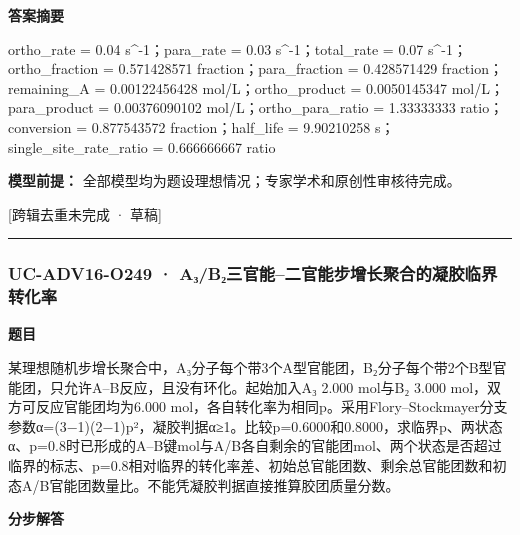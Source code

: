 \documentclass[UTF8,11pt,a4paper]{ctexart}
\begin{document}
\noindent\textbf{答案摘要}\par
ortho\_rate = 0.04 s\textasciicircum{}-1；para\_rate = 0.03 s\textasciicircum{}-1；total\_rate = 0.07 s\textasciicircum{}-1；ortho\_fraction = 0.571428571 fraction；para\_fraction = 0.428571429 fraction；remaining\_A = 0.00122456428 mol/L；ortho\_product = 0.0050145347 mol/L；para\_product = 0.00376090102 mol/L；ortho\_para\_ratio = 1.33333333 ratio；conversion = 0.877543572 fraction；half\_life = 9.90210258 s；single\_site\_rate\_ratio = 0.666666667 ratio\par
\noindent\textbf{模型前提：}
全部模型均为题设理想情况；专家学术和原创性审核待完成。\par
\noindent\textcolor{red!65!black}{[跨辑去重未完成 · 草稿]} \par
\medskip\hrule\medskip
{}
\subsubsection*{UC-ADV16-O249 · A₃/B₂三官能–二官能步增长聚合的凝胶临界转化率}
\noindent\textbf{题目}\par
某理想随机步增长聚合中，A₃分子每个带3个A型官能团，B₂分子每个带2个B型官能团，只允许A–B反应，且没有环化。起始加入A₃ 2.000 mol与B₂ 3.000 mol，双方可反应官能团均为6.000 mol，各自转化率为相同p。采用Flory–Stockmayer分支参数α=(3−1)(2−1)p²，凝胶判据α≥1。比较p=0.6000和0.8000，求临界p、两状态α、p=0.8时已形成的A–B键mol与A/B各自剩余的官能团mol、两个状态是否超过临界的标志、p=0.8相对临界的转化率差、初始总官能团数、剩余总官能团数和初态A/B官能团数量比。不能凭凝胶判据直接推算胶团质量分数。\par
\medskip\noindent\textbf{分步解答}
\end{document}
